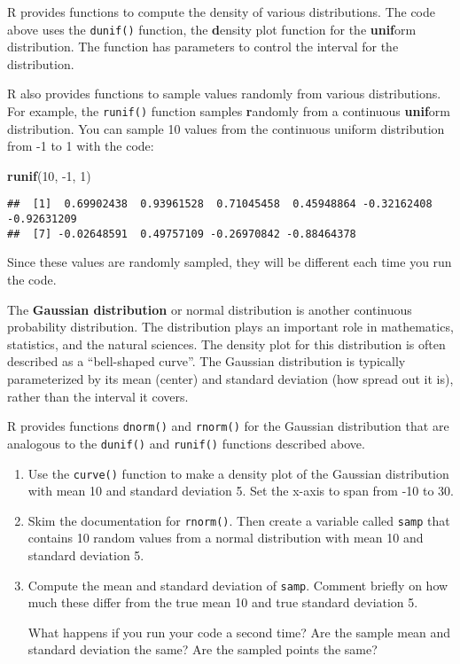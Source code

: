 \documentclass[
]{article}
\newenvironment{Shaded}{\begin{snugshade}}{\end{snugshade}}
\newcommand{\DecValTok}[1]{\textcolor[rgb]{0.00,0.00,0.81}{#1}}
\newcommand{\KeywordTok}[1]{\textcolor[rgb]{0.13,0.29,0.53}{\textbf{#1}}}
\newcommand{\NormalTok}[1]{#1}
\begin{document}
R provides functions to compute the density of various distributions.
The code above uses the \texttt{dunif()} function, the \textbf{d}ensity
plot function for the \textbf{unif}orm distribution. The function has
parameters to control the interval for the distribution.

R also provides functions to sample values randomly from various
distributions. For example, the \texttt{runif()} function samples
\textbf{r}andomly from a continuous \textbf{unif}orm distribution. You
can sample 10 values from the continuous uniform distribution from -1 to
1 with the code:

\begin{Shaded}
\begin{Highlighting}[]
\KeywordTok{runif}\NormalTok{(}\DecValTok{10}\NormalTok{, }\DecValTok{{-}1}\NormalTok{, }\DecValTok{1}\NormalTok{)}
\end{Highlighting}
\end{Shaded}

\begin{verbatim}
##  [1]  0.69902438  0.93961528  0.71045458  0.45948864 -0.32162408 -0.92631209
##  [7] -0.02648591  0.49757109 -0.26970842 -0.88464378
\end{verbatim}

Since these values are randomly sampled, they will be different each
time you run the code.

The \textbf{Gaussian distribution} or normal distribution is another
continuous probability distribution. The distribution plays an important
role in mathematics, statistics, and the natural sciences. The density
plot for this distribution is often described as a ``bell-shaped
curve''. The Gaussian distribution is typically parameterized by its
mean (center) and standard deviation (how spread out it is), rather than
the interval it covers.

R provides functions \texttt{dnorm()} and \texttt{rnorm()} for the
Gaussian distribution that are analogous to the \texttt{dunif()} and
\texttt{runif()} functions described above.

\begin{enumerate}
\def\labelenumi{\arabic{enumi}.}
\item
  Use the \texttt{curve()} function to make a density plot of the
  Gaussian distribution with mean 10 and standard deviation 5. Set the
  x-axis to span from -10 to 30.
\item
  Skim the documentation for \texttt{rnorm()}. Then create a variable
  called \texttt{samp} that contains 10 random values from a normal
  distribution with mean 10 and standard deviation 5.
\item
  Compute the mean and standard deviation of \texttt{samp}. Comment
  briefly on how much these differ from the true mean 10 and true
  standard deviation 5.

  What happens if you run your code a second time? Are the sample mean
  and standard deviation the same? Are the sampled points the same?
\end{enumerate}
\end{document}
